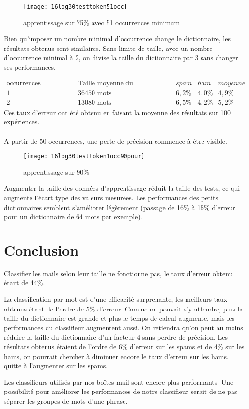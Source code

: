 \documentclass[a4paper]{article}
\begin{document}
\begin{minipage}{\textwidth}
\begin{figure}[H]
\texttt{[image: 16log30testtoken51occ]}
\caption{apprentissage sur 75\% avec 51 occurrences minimum}
\end{figure}
Bien qu'imposer un nombre minimal d'occurrence change le dictionnaire, les résultats obtenus sont similaires. Sans limite de taille, avec un nombre d'occurrence minimal à 2, on divise la taille du dictionnaire par 3 sans changer ses performances.

\[\begin{array}{ccccc}
\text{occurrences minimales} & \text{Taille moyenne du dictionnaire} & spam & ham & moyenne\\
1 & \text{36450 mots} & 6,2\% & 4,0\% & 4,9\%\\
2 & \text{13080 mots} & 6,5\% & 4,2\% & 5,2\%
\end{array}\]
Ces taux d'erreur ont été obtenu en faisant la moyenne des résultats sur 100 expériences.\\\\

A partir de 50 occurrences, une perte de précision commence à être visible.
\end{minipage}

\begin{minipage}{\textwidth}
\begin{figure}[H]
\texttt{[image: 16log30testtoken1occ90pour]}
\caption{apprentissage sur 90\%}
\end{figure}
Augmenter la taille des données d'apprentissage réduit la taille des tests, ce qui augmente l'écart type des valeurs mesurées. Les performances des petits dictionnaires semblent s'améliorer légèrement (passage de 16\% à 15\% d'erreur pour un dictionnaire de 64 mots par exemple).

\end{minipage}



\section{Conclusion}
Classifier les mails selon leur taille ne fonctionne pas, le taux d'erreur obtenu étant de 44\%.

La classification par mot est d'une efficacité surprenante, les meilleurs taux obtenus étant de l'ordre de 5\% d'erreur. Comme on pouvait s'y attendre, plus la taille du dictionnaire est grande et plus le temps de calcul augmente, mais les performances du classifieur augmentent aussi. On retiendra qu'on peut au moins réduire la taille du dictionnaire d'un facteur 4 sans perdre de précision. Les résultats obtenus étaient de l'ordre de 6\% d'erreur sur les spams et de 4\% sur les hams, on pourrait chercher à diminuer encore le taux d'erreur sur les hams, quitte à l'augmenter sur les spams.

Les classifieurs utilisés par nos boîtes mail sont encore plus performants. Une possibilité pour améliorer les performances de notre classifieur serait de ne pas séparer les groupes de mots d'une phrase.
\end{document}
